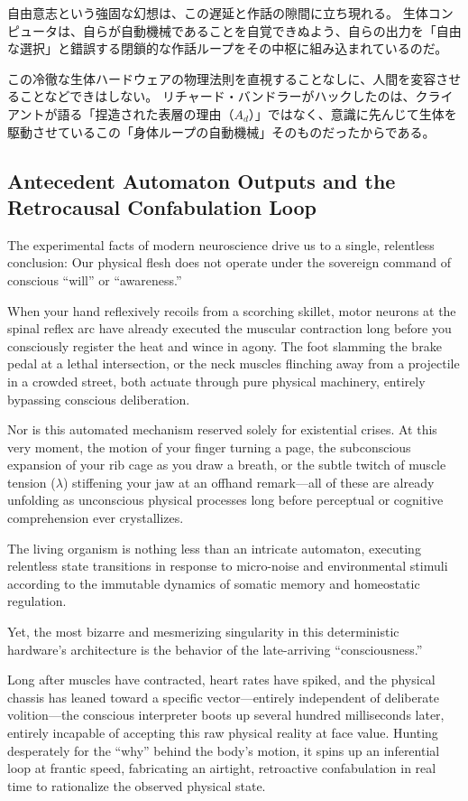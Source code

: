     自由意志という強固な幻想は、この遅延と作話の隙間に立ち現れる。
    生体コンピュータは、自らが自動機械であることを自覚できぬよう、自らの出力を「自由な選択」と錯誤する閉鎖的な作話ループをその中枢に組み込まれているのだ。

    この冷徹な生体ハードウェアの物理法則を直視することなしに、人間を変容させることなどできはしない。
    リチャード・バンドラーがハックしたのは、クライアントが語る「捏造された表層の理由（$A_d$）」ではなく、意識に先んじて生体を駆動させているこの「身体ループの自動機械」そのものだったからである。
\else
    \subsection{Antecedent Automaton Outputs and the Retrocausal Confabulation Loop}
    The experimental facts of modern neuroscience drive us to a single, relentless conclusion:
    Our physical flesh does not operate under the sovereign command of conscious ``will'' or ``awareness.''

    When your hand reflexively recoils from a scorching skillet, motor neurons at the spinal reflex arc have already executed the muscular contraction long before you consciously register the heat and wince in agony. The foot slamming the brake pedal at a lethal intersection, or the neck muscles flinching away from a projectile in a crowded street, both actuate through pure physical machinery, entirely bypassing conscious deliberation.

    Nor is this automated mechanism reserved solely for existential crises.
    At this very moment, the motion of your finger turning a page, the subconscious expansion of your rib cage as you draw a breath, or the subtle twitch of muscle tension ($\lambda$) stiffening your jaw at an offhand remark—all of these are already unfolding as unconscious physical processes long before perceptual or cognitive comprehension ever crystallizes.

    The living organism is nothing less than an intricate automaton, executing relentless state transitions in response to micro-noise and environmental stimuli according to the immutable dynamics of somatic memory and homeostatic regulation.

    Yet, the most bizarre and mesmerizing singularity in this deterministic hardware's architecture is the behavior of the late-arriving ``consciousness.''

    Long after muscles have contracted, heart rates have spiked, and the physical chassis has leaned toward a specific vector—entirely independent of deliberate volition—the conscious interpreter boots up several hundred milliseconds later, entirely incapable of accepting this raw physical reality at face value.
    Hunting desperately for the ``why'' behind the body's motion, it spins up an inferential loop at frantic speed, fabricating an airtight, retroactive confabulation in real time to rationalize the observed physical state.

